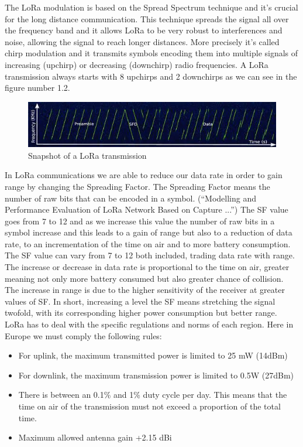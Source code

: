 The LoRa modulation is based on the Spread Spectrum technique and
it's crucial for the long distance communication. This technique spreads
the signal all over the frequency band and it allows LoRa to be very
robust to interferences and noise, allowing the signal to reach longer
distances. More precisely it's called chirp modulation and it transmits
symbols encoding them into multiple signals of increasing (upchirp) or
decreasing (downchirp) radio frequencies. A LoRa transmission always
starts with 8 upchirps and 2 downchirps as we can see in the figure
number 1.2.
\begin{figure}[htbp]
\includegraphics[width=\linewidth]{lorainitchirp.png}
\caption{Snapshot of a LoRa transmission}
\end{figure}
In LoRa communications we are able to reduce our data rate in order to
gain range by changing the Spreading Factor. The Spreading Factor
means the number of raw bits that can be encoded in a symbol.
(“Modelling and Performance Evaluation of LoRa Network Based on
Capture ...”) The SF value goes from 7 to 12 and as we increase this
value the number of raw bits in a symbol increase and this leads to a
gain of range but also to a reduction of data rate, to an incrementation
of the time on air and to more battery consumption. \\
The SF value can vary from 7 to 12 both included, trading data rate with
range. The increase or decrease in data rate is proportional to the time
on air, greater meaning not only more battery consumed but also greater
chance of collision. The increase in range is due to the higher sensitivity
of the receiver at greater values of SF. In short, increasing a level the
SF means stretching the signal twofold, with its corresponding higher
power consumption but better range.\\
LoRa has to deal with the specific regulations and norms of each region.
Here in Europe we must comply the following rules:
\begin{itemize}
   \item For uplink, the maximum transmitted power is limited to 25 mW
(14dBm) 
    \item For downlink, the maximum transmission power is limited to 0.5W
(27dBm)
    \item There is between an 0.1\% and 1\% duty cycle per day. This means
            that the time on air of the transmission must not exceed a
            proportion of the total time.
    \item Maximum allowed antenna gain +2.15 dBi
\end{itemize}
